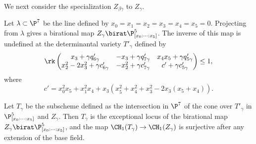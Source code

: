 We next consider the specialization $Z_{\beta \gamma}$ to $Z_\gamma$.
\begin{lemma}
\label{lem:TDefinition}
 Let $\lambda \subset \P^7$ be the line defined by $x_0 = x_1 = x_2 = x_3 = x_4 = x_5 = 0$. Projecting from $\lambda$ gives a birational map $Z_\gamma \birat \P^5_{[x_0:\dots:x_5]}$. The inverse of this map is undefined at the determinantal variety $T'_\gamma$ defined by
 \begin{equation}
   \label{eq:T'Matrix}
\rk
  \begin{pmatrix}
    x_3 +  \gamma q'_{6\gamma} & -x_3 + \gamma q'_{7\gamma} & x_4x_5 + \gamma q'_{5\gamma} \\
    x_2^2 - 2x_3^2 + \gamma c'_{6 \gamma} & -x_2^2 + \gamma c'_{7 \gamma} & c' + \gamma c'_{5 \gamma}
  \end{pmatrix} \leq 1,   
 \end{equation}
where 
\[ c' = x_0^2x_5 + x_1^2x_4 + x_3\left(x_5^2 + x_4^2 + x_3^2 - 2x_3(x_5 + x_4)\right).\]

Let $T_\gamma$ be the subscheme defined as the intersection in $\P^7$ of the cone over $T'_\gamma$ in $\P^5_{[x_0:\dots:x_5]}$ and $Z_\gamma$. Then $T_\gamma$ is the exceptional locus of the birational map $Z_\gamma \birat \P^5_{[x_0:\dots:x_5]}$, and the map $\CH_1(T_\gamma) \to \CH_1(Z_\gamma)$ is surjective after any extension of the base field.
\end{lemma}
